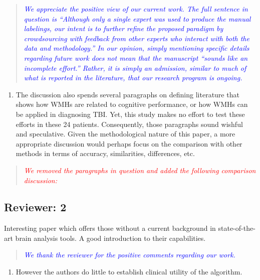\documentclass[12pt,]{article}
\providecommand{\tightlist}{%
  \setlength{\itemsep}{0pt}\setlength{\parskip}{0pt}}
\begin{document}
\begin{quote}
\emph{\textcolor{blue}{We appreciate the positive view of our current work.
The full sentence in question is ``Although only a
single expert was used to produce the manual labelings, our intent is to
further refine the proposed paradigm by crowdsourcing with feedback from
other experts who interact with both the data and methodology.''
In our opinion, simply mentioning specific details regarding future work
does not mean that the manuscript ``sounds like an incomplete effort.''
Rather, it is simply an admission, similar to much of what is reported
in the literature, that our research program is ongoing.}}
\end{quote}

\begin{enumerate}
\def\labelenumi{\arabic{enumi}.}
\setcounter{enumi}{14}
\tightlist
\item
  The discussion also spends several paragraphs on defining literature
  that shows how WMHs are related to cognitive performance, or how WMHs
  can be applied in diagnosing TBI. Yet, this study makes no effort to
  test these efforts in these 24 patients. Consequently, those
  paragraphs sound wishful and speculative. Given the methodological
  nature of this paper, a more appropriate discussion would perhaps
  focus on the comparison with other methods in terms of accuracy,
  similarities, differences, etc.
\end{enumerate}

\begin{quote}
\emph{\textcolor{red}{We removed the paragraphs in question and added the following
comparison discussion:}}
\end{quote}

\subsection{Reviewer: 2}\label{reviewer-2}

Interesting paper which offers those without a current background in
state-of-the-art brain analysis tools. A good introduction to their
capabilities.

\begin{quote}
\emph{\textcolor{blue}{We thank the reviewer for the positive comments regarding our work.}}
\end{quote}

\begin{enumerate}
\def\labelenumi{\arabic{enumi}.}
\tightlist
\item
  However the authors do little to establish clinical utility of the
  algorithm.
\end{enumerate}
\end{document}
